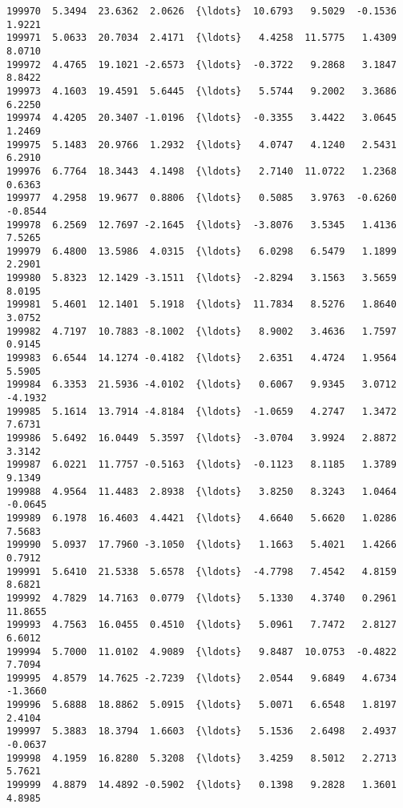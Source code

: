 \documentclass[11pt]{article}
\begin{document}
\begin{Verbatim}[commandchars=\\\{\}]
199970  5.3494  23.6362  2.0626  {\ldots}  10.6793   9.5029  -0.1536   1.9221   
199971  5.0633  20.7034  2.4171  {\ldots}   4.4258  11.5775   1.4309   8.0710   
199972  4.4765  19.1021 -2.6573  {\ldots}  -0.3722   9.2868   3.1847   8.8422   
199973  4.1603  19.4591  5.6445  {\ldots}   5.5744   9.2002   3.3686   6.2250   
199974  4.4205  20.3407 -1.0196  {\ldots}  -0.3355   3.4422   3.0645   1.2469   
199975  5.1483  20.9766  1.2932  {\ldots}   4.0747   4.1240   2.5431   6.2910   
199976  6.7764  18.3443  4.1498  {\ldots}   2.7140  11.0722   1.2368   0.6363   
199977  4.2958  19.9677  0.8806  {\ldots}   0.5085   3.9763  -0.6260  -0.8544   
199978  6.2569  12.7697 -2.1645  {\ldots}  -3.8076   3.5345   1.4136   7.5265   
199979  6.4800  13.5986  4.0315  {\ldots}   6.0298   6.5479   1.1899   2.2901   
199980  5.8323  12.1429 -3.1511  {\ldots}  -2.8294   3.1563   3.5659   8.0195   
199981  5.4601  12.1401  5.1918  {\ldots}  11.7834   8.5276   1.8640   3.0752   
199982  4.7197  10.7883 -8.1002  {\ldots}   8.9002   3.4636   1.7597   0.9145   
199983  6.6544  14.1274 -0.4182  {\ldots}   2.6351   4.4724   1.9564   5.5905   
199984  6.3353  21.5936 -4.0102  {\ldots}   0.6067   9.9345   3.0712  -4.1932   
199985  5.1614  13.7914 -4.8184  {\ldots}  -1.0659   4.2747   1.3472   7.6731   
199986  5.6492  16.0449  5.3597  {\ldots}  -3.0704   3.9924   2.8872   3.3142   
199987  6.0221  11.7757 -0.5163  {\ldots}  -0.1123   8.1185   1.3789   9.1349   
199988  4.9564  11.4483  2.8938  {\ldots}   3.8250   8.3243   1.0464  -0.0645   
199989  6.1978  16.4603  4.4421  {\ldots}   4.6640   5.6620   1.0286   7.5683   
199990  5.0937  17.7960 -3.1050  {\ldots}   1.1663   5.4021   1.4266   0.7912   
199991  5.6410  21.5338  5.6578  {\ldots}  -4.7798   7.4542   4.8159   8.6821   
199992  4.7829  14.7163  0.0779  {\ldots}   5.1330   4.3740   0.2961  11.8655   
199993  4.7563  16.0455  0.4510  {\ldots}   5.0961   7.7472   2.8127   6.6012   
199994  5.7000  11.0102  4.9089  {\ldots}   9.8487  10.0753  -0.4822   7.7094   
199995  4.8579  14.7625 -2.7239  {\ldots}   2.0544   9.6849   4.6734  -1.3660   
199996  5.6888  18.8862  5.0915  {\ldots}   5.0071   6.6548   1.8197   2.4104   
199997  5.3883  18.3794  1.6603  {\ldots}   5.1536   2.6498   2.4937  -0.0637   
199998  4.1959  16.8280  5.3208  {\ldots}   3.4259   8.5012   2.2713   5.7621   
199999  4.8879  14.4892 -0.5902  {\ldots}   0.1398   9.2828   1.3601   4.8985   


\end{Verbatim}
\end{document}
